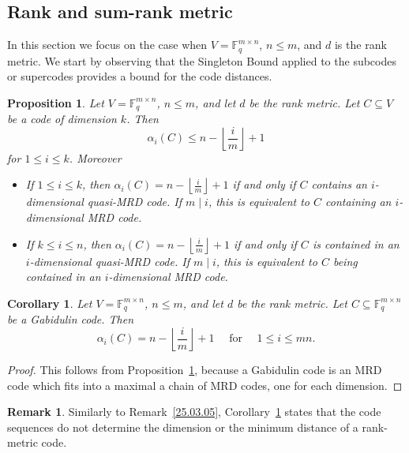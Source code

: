 \documentclass[12pt]{amsart}
\numberwithin{equation}{section}
\newtheorem{proposition}[theorem]{Proposition}
\newtheorem{corollary}[theorem]{Corollary}
\theoremstyle{definition}
\newtheorem{remark}[theorem]{Remark}
\newcommand{\FF}{\mathbb{F}}
\begin{document}
\subsection{Rank and sum-rank metric}

In this section we focus on the case when $V=\mathbb{F}_q^{m\times n}$, $n\leq m$, and $d$ is the rank metric.
We start by observing that the Singleton Bound applied to the subcodes or supercodes provides a bound for the code distances. 

\begin{proposition}\label{alpha for MRD}
Let $V=\mathbb{F}_q^{m\times n}$, $n\leq m$, and let $d$ be the rank metric. Let $C \subseteq V$ be a code of dimension $k$. Then $$\alpha_i(C)\leq n-\left\lfloor\frac{i}{m}\right\rfloor+1$$ for $1\leq i\leq k$. Moreover
\begin{itemize}
\item If $1\leq i \leq k$, then $\alpha_i(C)= n-\left\lfloor\frac{i}{m}\right\rfloor+1$ if and only if $C$ contains an $i$-dimensional quasi-MRD code. If $m\mid i$, this is equivalent to $C$ containing an $i$-dimensional MRD code.
\item If $k \leq i \leq n$, then $\alpha_i(C)= n-\left\lfloor\frac{i}{m}\right\rfloor+1$ if and only if $C$ is contained in an $i$-dimensional quasi-MRD code. If $m\mid i$, this is equivalent to $C$ being contained in an $i$-dimensional MRD code.
\end{itemize}
\end{proposition}

\begin{corollary}\label{25.03.06}
Let $V=\mathbb{F}_q^{m\times n}$, $n\leq m$, and let $d$ be the rank metric. Let $C\subseteq\FF_q^{m\times n}$ be a Gabidulin code. Then
\[\alpha_i(C)=n-\left\lfloor\frac{i}{m}\right\rfloor+1 \quad \text{ for } \quad 1\leq i\leq mn.\]
\end{corollary}

\begin{proof}
This follows from Proposition~\ref{alpha for MRD}, because a Gabidulin code is an MRD code which fits into a maximal a chain of MRD codes, one for each dimension.
\end{proof}

\begin{remark}
Similarly to Remark~\ref{25.03.05}, Corollary~\ref{25.03.06} states that the code sequences do not determine the dimension or the minimum distance of a rank-metric code.
\end{remark}
\end{document}
